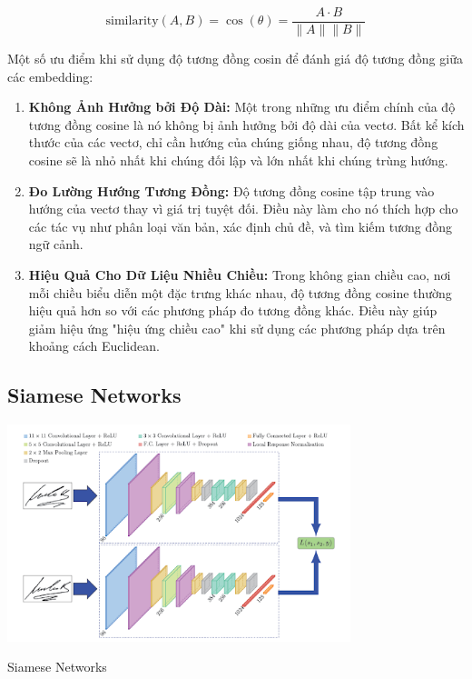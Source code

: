 \documentclass[a4paper, 12pt, openany]{book}
\begin{document}
\begin{equation}
    \text{similarity}(A, B) = \cos(\theta) = \frac{A \cdot B}{\|A\| \|B\|}
\end{equation}

Một số ưu điểm khi sử dụng độ tương đồng cosin để đánh giá độ tương đồng giữa các embedding:
\begin{enumerate}
    \item \textbf{Không Ảnh Hưởng bởi Độ Dài:} Một trong những ưu điểm chính của độ tương đồng cosine là nó không bị ảnh hưởng bởi độ dài của vectơ. Bất kể kích thước của các vectơ, chỉ cần hướng của chúng giống nhau, độ tương đồng cosine sẽ là nhỏ nhất khi chúng đối lập và lớn nhất khi chúng trùng hướng.

    \item \textbf{Đo Lường Hướng Tương Đồng:} Độ tương đồng cosine tập trung vào hướng của vectơ thay vì giá trị tuyệt đối. Điều này làm cho nó thích hợp cho các tác vụ như phân loại văn bản, xác định chủ đề, và tìm kiếm tương đồng ngữ cảnh.

    \item \textbf{Hiệu Quả Cho Dữ Liệu Nhiều Chiều:} Trong không gian chiều cao, nơi mỗi chiều biểu diễn một đặc trưng khác nhau, độ tương đồng cosine thường hiệu quả hơn so với các phương pháp đo tương đồng khác. Điều này giúp giảm hiệu ứng "hiệu ứng chiều cao" khi sử dụng các phương pháp dựa trên khoảng cách Euclidean.
\end{enumerate}

\subsection{Siamese Networks}

\begin{minipage}{\linewidth}
    \captionsetup{type=figure}
    \centering
    \includegraphics[width=10cm]{./assets/images/1_siamese-network.png}
    \caption{Siamese Networks\cite{https://builtin.com/machine-learning/siamese-network}}
\end{minipage} 
\end{document}
